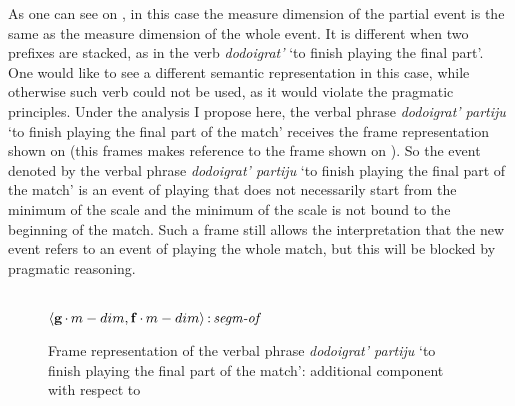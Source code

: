 As one can see on , in this case the measure dimension of the partial event is the same as the measure dimension of the whole event. It is different when two prefixes are stacked, as in the verb \textit{dodoigrat'} `to finish playing the final part'. One would like to see a different semantic representation in this case, while otherwise such verb could not be used, as it would violate the pragmatic principles. Under the analysis I propose here, the verbal phrase \textit{dodoigrat' partiju} `to finish playing the final part of the match' receives the frame representation shown on  (this frames makes reference to the frame shown on ). So the event denoted by the verbal phrase \textit{dodoigrat' partiju} `to finish playing the final part of the match' is an event of playing that does not necessarily start from the minimum of the scale and the minimum of the scale is not bound to the beginning of the match. Such a frame still allows the interpretation that the new event refers to an event of playing the whole match, but this will be blocked by pragmatic reasoning.

\begin{figure}
\\
$\langle{\textbf{\textrm{g}}\,{\cdot}\,m-dim,\textbf{\textrm{f}}\,{\cdot}\,m-dim}\rangle\,{:}\,\textit{segm-of}$\\[1ex]
\caption{Frame representation of the verbal phrase \textit{dodoigrat' partiju} `to finish playing the final part of the match': additional component with respect to  \label{frame:do:do:igrat:partiju}}
\end{figure}

